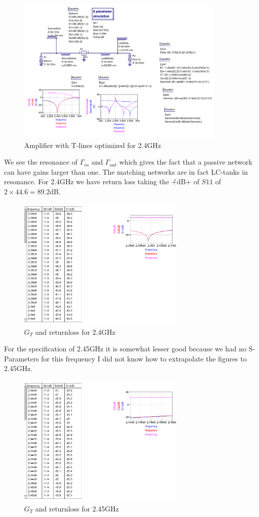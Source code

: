 \documentclass{article}
\begin{document}
\begin{figure}[H]
\centering
  \includegraphics[width=100mm, scale=0.5]{Amp2_4GHzTLine.png}
  \caption{Amplifier with T-lines optimized for 2.4GHz}
  \label{fig4}
\end{figure}
We see the resonance of $\Gamma_{in}$ and $\Gamma_{out}$ which gives the
fact that a passive network can have gains larger than one.
The matching networks are in fact LC-tanks in resonance.
For 2.4GHz we have return loss taking the \v+dB+ of $S11$
of $2\times 44.6=89.2$dB.
\begin{figure}[H]
\centering
  \includegraphics[width=80mm,scale=0.5]{Amp2_4GHzTLineData1.png}
  \caption{$G_T$ and returnloss for 2.4GHz}
  \label{fig4}
\end{figure}
For the specification of 2.45GHz it is somewhat lesser good because we had no
S-Parameters for this frequency I did not know how to extrapolate the figures
to 2.45GHz.
\begin{figure}[H]
\centering
  \includegraphics[width=80mm,scale=0.5]{Amp2_4GHzTLineData2.png}
  \caption{$G_T$ and returnloss for 2.45GHz}
  \label{fig4}
\end{figure}
\end{document}
